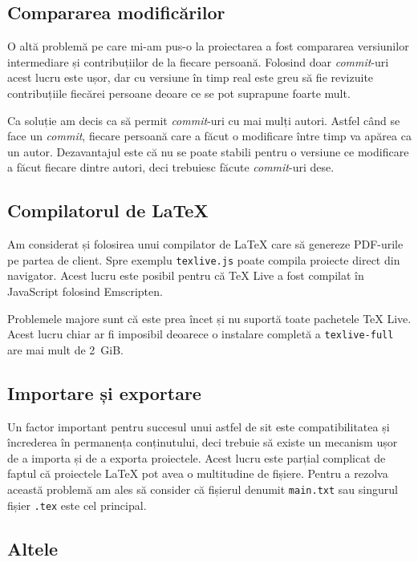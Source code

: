 \documentclass[a4wide,12pt]{report}
\newcommand{\eng}[1]{\emph{#1}} %
\newcommand{\cod}[1]{\texttt{#1}}
\begin{document}
\subsection{Compararea modificărilor}

O altă problemă pe care mi-am pus-o la proiectarea a fost compararea versiunilor
intermediare și contribuțiilor de la fiecare persoană. Folosind doar
\eng{commit}-uri acest lucru este ușor, dar cu versiune în timp real este greu
să fie revizuite contribuțiile fiecărei persoane deoare ce se pot suprapune
foarte mult.

Ca soluție am decis ca să permit \eng{commit}-uri cu mai mulți autori. Astfel
când se face un \eng{commit}, fiecare persoană care a făcut o modificare între
timp va apărea ca un autor. Dezavantajul este că nu se poate stabili pentru o
versiune ce modificare a făcut fiecare dintre autori, deci trebuiesc făcute
\eng{commit}-uri dese.

\subsection{Compilatorul de \LaTeX}

Am considerat și folosirea unui compilator de \LaTeX{} care să genereze
PDF-urile pe partea de client. Spre exemplu \cod{texlive.js}\cite{texlivejs}
poate compila proiecte direct din navigator. Acest lucru este posibil pentru că
\TeX{} Live a fost compilat în JavaScript folosind Emscripten.

Problemele majore sunt că este prea încet și nu suportă toate pachetele \TeX{}
Live. Acest lucru chiar ar fi imposibil deoarece o instalare completă a
\cod{texlive-full} are mai mult de 2~GiB.

\subsection{Importare și exportare}

Un factor important pentru succesul unui astfel de sit este compatibilitatea și
încrederea în permanența conținutului, deci trebuie să existe un mecanism ușor
de a importa și de a exporta proiectele. Acest lucru este parțial complicat de
faptul că proiectele \LaTeX{} pot avea o multitudine de fișiere. Pentru a
rezolva această problemă am ales să consider că fișierul denumit \cod{main.txt}
sau singurul fișier \cod{.tex} este cel principal.

\subsection{Altele}
\end{document}
